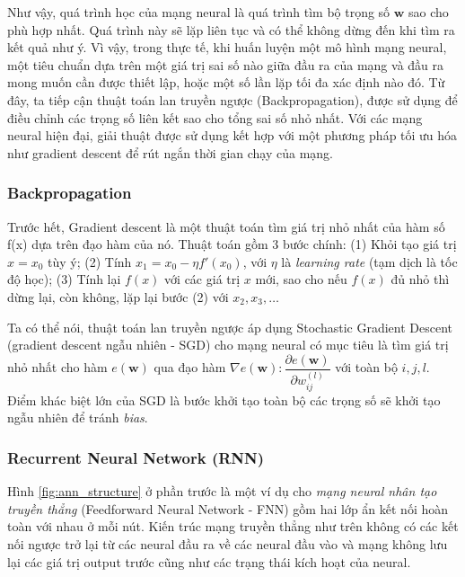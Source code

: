     Như vậy, quá trình học của mạng neural là quá trình tìm bộ trọng số $\textbf{w}$ sao cho phù hợp nhất. Quá trình này sẽ lặp liên tục và có thể không dừng đến khi tìm ra kết quả như ý. Vì vậy, trong thực tế, khi huấn luyện một mô hình mạng neural, một tiêu chuẩn dựa trên một giá trị sai số nào giữa đầu ra của mạng và đầu ra mong muốn cần được thiết lập, hoặc một số lần lặp tối đa xác định nào đó. Từ đây, ta tiếp cận thuật toán lan truyền ngược (Backpropagation), được sử dụng để điều chỉnh các trọng số liên kết sao cho tổng sai số nhỏ nhất. Với các mạng neural hiện đại, giải thuật được sử dụng kết hợp với một phương pháp tối ưu hóa như gradient descent để rút ngắn thời gian chạy của mạng.
    
    \subsubsection{Backpropagation}
    Trước hết, Gradient descent là một thuật toán tìm giá trị nhỏ nhất của hàm số f(x) dựa trên đạo hàm của nó. Thuật toán gồm 3 bước chính: (1) Khỏi tạo giá trị $x = x_0$ tùy ý; (2) Tính $x_1 = x_0 - \eta f'(x_0)$, với $\eta$ là \textit{learning rate} (tạm dịch là tốc độ học); (3) Tính lại $f(x)$ với các giá trị $x$ mới, sao cho nếu $f(x)$ đủ nhỏ thì dừng lại, còn không, lặp lại bước (2) với $x_2, x_3,\dotsc$
    
    Ta có thể nói, thuật toán lan truyền ngược áp dụng Stochastic Gradient Descent (gradient descent ngẫu nhiên - SGD) cho mạng neural có mục tiêu là tìm giá trị nhỏ nhất cho hàm $e(\textbf{w})$ qua đạo hàm $\nabla e(\textbf{w}): \dfrac{\partial e(\textbf{w})}{\partial w^{(l)}_{ij}}$ với toàn bộ $i, j, l$. Điểm khác biệt lớn của SGD là bước khởi tạo toàn bộ các trọng số sẽ khởi tạo ngẫu nhiên để tránh \textit{bias}.
    
    \subsubsection{Recurrent Neural Network (RNN)}
    Hình \ref{fig:ann_structure} ở phần trước là một ví dụ cho \textit{mạng neural nhân tạo truyền thẳng} (Feedforward Neural Network - FNN) gồm hai lớp ẩn kết nối hoàn toàn với nhau ở mỗi nút. Kiến trúc mạng truyền thẳng như trên không có các kết nối ngược trở lại từ các neural đầu ra về các neural đầu vào và mạng không lưu lại các giá trị output trước cũng như các trạng thái kích hoạt của neural. 
    
